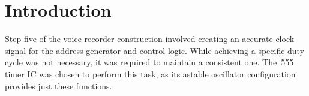 \section{Introduction}

Step five of the voice recorder construction involved creating an accurate
clock signal for the address generator and control logic.  While achieving a
specific duty cycle was not necessary, it was required to maintain a consistent
one.  The~555 timer IC was chosen to perform this task, as its astable
oscillator configuration provides just these functions.

